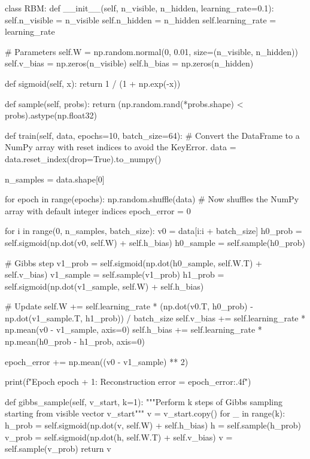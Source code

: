 \documentclass[%
oneside,                 %
final,                   %
10pt]{article}
\begin{document}
class RBM:
    def __init__(self, n_visible, n_hidden, learning_rate=0.1):
        self.n_visible = n_visible
        self.n_hidden = n_hidden
        self.learning_rate = learning_rate

        # Parameters
        self.W = np.random.normal(0, 0.01, size=(n_visible, n_hidden))
        self.v_bias = np.zeros(n_visible)
        self.h_bias = np.zeros(n_hidden)

    def sigmoid(self, x):
        return 1 / (1 + np.exp(-x))

    def sample(self, probs):
        return (np.random.rand(*probs.shape) < probs).astype(np.float32)

    def train(self, data, epochs=10, batch_size=64):
        # Convert the DataFrame to a NumPy array with reset indices to avoid the KeyError.
        data = data.reset_index(drop=True).to_numpy() 
        
        n_samples = data.shape[0]

        for epoch in range(epochs):
            np.random.shuffle(data) # Now shuffles the NumPy array with default integer indices
            epoch_error = 0
    

            for i in range(0, n_samples, batch_size):
                v0 = data[i:i + batch_size]
                h0_prob = self.sigmoid(np.dot(v0, self.W) + self.h_bias)
                h0_sample = self.sample(h0_prob)

                # Gibbs step
                v1_prob = self.sigmoid(np.dot(h0_sample, self.W.T) + self.v_bias)
                v1_sample = self.sample(v1_prob)
                h1_prob = self.sigmoid(np.dot(v1_sample, self.W) + self.h_bias)

                # Update
                self.W += self.learning_rate * (np.dot(v0.T, h0_prob) - np.dot(v1_sample.T, h1_prob)) / batch_size
                self.v_bias += self.learning_rate * np.mean(v0 - v1_sample, axis=0)
                self.h_bias += self.learning_rate * np.mean(h0_prob - h1_prob, axis=0)

                epoch_error += np.mean((v0 - v1_sample) ** 2)

            print(f"Epoch {epoch + 1}: Reconstruction error = {epoch_error:.4f}")

    def gibbs_sample(self, v_start, k=1):
        """Perform k steps of Gibbs sampling starting from visible vector v_start"""
        v = v_start.copy()
        for _ in range(k):
            h_prob = self.sigmoid(np.dot(v, self.W) + self.h_bias)
            h = self.sample(h_prob)
            v_prob = self.sigmoid(np.dot(h, self.W.T) + self.v_bias)
            v = self.sample(v_prob)
        return v
\end{document}
